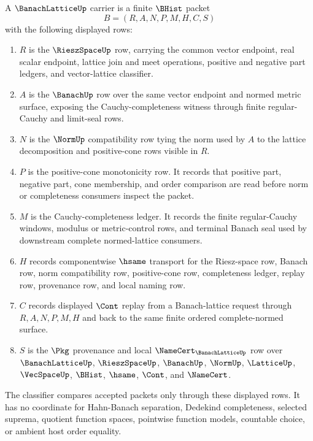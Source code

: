 \begin{definition}
\label{def:banach-lattice-carrier}
A $\BanachLatticeUp$ carrier is a finite $\BHist$ packet
$$
B=(R,A,N,P,M,H,C,S)
$$
with the following displayed rows:
\begin{enumerate}
\item $R$ is the $\RieszSpaceUp$ row, carrying the common vector endpoint, real scalar endpoint, lattice join and meet operations, positive and negative part ledgers, and vector-lattice classifier.
\item $A$ is the $\BanachUp$ row over the same vector endpoint and normed metric surface, exposing the Cauchy-completeness witness through finite regular-Cauchy and limit-seal rows.
\item $N$ is the $\NormUp$ compatibility row tying the norm used by $A$ to the lattice decomposition and positive-cone rows visible in $R$.
\item $P$ is the positive-cone monotonicity row. It records that positive part, negative part, cone membership, and order comparison are read before norm or completeness consumers inspect the packet.
\item $M$ is the Cauchy-completeness ledger. It records the finite regular-Cauchy windows, modulus or metric-control rows, and terminal Banach seal used by downstream complete normed-lattice consumers.
\item $H$ records componentwise $\hsame$ transport for the Riesz-space row, Banach row, norm compatibility row, positive-cone row, completeness ledger, replay row, provenance row, and local naming row.
\item $C$ records displayed $\Cont$ replay from a Banach-lattice request through $R,A,N,P,M,H$ and back to the same finite ordered complete-normed surface.
\item $S$ is the $\Pkg$ provenance and local $\NameCert_{\BanachLatticeUp}$ row over $\BanachLatticeUp$, $\RieszSpaceUp$, $\BanachUp$, $\NormUp$, $\LatticeUp$, $\VecSpaceUp$, $\BHist$, $\hsame$, $\Cont$, and $\NameCert$.
\end{enumerate}
The classifier compares accepted packets only through these displayed rows. It has no coordinate for Hahn-Banach separation, Dedekind completeness, selected suprema, quotient function spaces, pointwise function models, countable choice, or ambient host order equality.
\end{definition}


